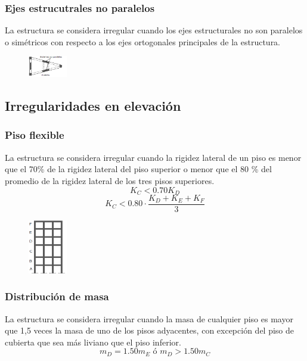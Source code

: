 \documentclass{report}
\begin{document}
\subsubsection{Ejes estrucutrales no paralelos }
La estructura se considera irregular cuando los ejes estructurales no son paralelos o sim\'etricos 
con respecto a los ejes ortogonales principales de la estructura.

\begin{figure}[h]
    \centering
    \includegraphics[width=0.15\textwidth]{imagenes/ejes_estructurales_no_paralelos.png}
\end{figure}

\subsection{Irregularidades en elevaci\'on }

\subsubsection{Piso flexible }
La estructura se considera irregular cuando la rigidez lateral de un piso es menor que el 70\% de la rigidez 
lateral del piso superior o menor que el 80 \% del promedio de la rigidez lateral de los tres pisos superiores.
$$K_C < 0.70K_D$$
$$K_C < 0.80 \cdot \dfrac{K_D + K_E + K_F}{3}$$

\begin{figure}[h]
    \centering
    \includegraphics[width=0.15\textwidth]{imagenes/piso_flexible.png}
\end{figure}

\subsubsection{Distribuci\'on de masa }
La estructura se considera irregular cuando la masa de cualquier piso es mayor que 1,5 veces la masa 
de uno de los pisos adyacentes, con excepci\'on del piso de cubierta que sea m\'as liviano que el piso inferior.
$$m_D = 1.50m_E \text{ \'o } m _D > 1.50 m_C$$
\end{document}
